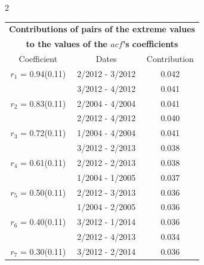 
\thispagestyle{empty}
\begin{multicols}{2}{ 
\begin{tabular}{ccc}
\multicolumn{3}{c}{\textbf{Contributions of pairs of the extreme values} }  \vspace{-.10in}  \\ 
\multicolumn{3}{c}{ \textbf{to the values of the $acf$'s coefficients}} \\ 
\hline 
\hline                  Coefficient  &  Dates &  Contribution \\ 
\hline 
  $r_{ 1}$ = 0.94(0.11) &       2/2012 -  3/2012 &        0.042   \vspace{-.10in} \\  
&        3/2012 -  4/2012 &        0.041  \vspace{-.02in} \\ \hline 
  $r_{ 2}$ = 0.83(0.11) &       2/2004 -  4/2004 &        0.041   \vspace{-.10in} \\  
&        2/2012 -  4/2012 &        0.040  \vspace{-.02in} \\ \hline 
  $r_{ 3}$ = 0.72(0.11) &       1/2004 -  4/2004 &        0.041   \vspace{-.10in} \\  
&        3/2012 -  2/2013 &        0.038  \vspace{-.02in} \\ \hline 
  $r_{ 4}$ = 0.61(0.11) &       2/2012 -  2/2013 &        0.038   \vspace{-.10in} \\  
&        1/2004 -  1/2005 &        0.037  \vspace{-.02in} \\ \hline 
  $r_{ 5}$ = 0.50(0.11) &       2/2012 -  3/2013 &        0.036   \vspace{-.10in} \\  
&        1/2004 -  2/2005 &        0.036  \vspace{-.02in} \\ \hline 
  $r_{ 6}$ = 0.40(0.11) &       3/2012 -  1/2014 &        0.036   \vspace{-.10in} \\  
&        2/2012 -  4/2013 &        0.034  \vspace{-.02in} \\ \hline 
  $r_{ 7}$ = 0.30(0.11) &       3/2012 -  2/2014 &        0.036   \vspace{-.10in} \\  

\end{tabular}}
\end{multicols}
